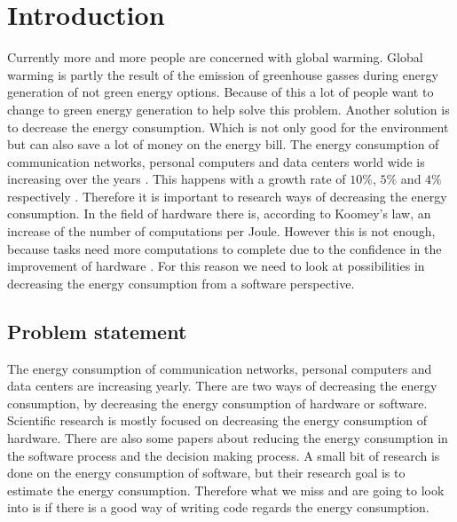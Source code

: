 \chapter{Introduction}
\label{ch:introduction}
Currently more and more people are concerned with global warming. Global warming is partly the result of the emission of greenhouse gasses during energy generation of not green energy options. Because of this a lot of people want to change to green energy generation to help solve this problem. Another solution is to decrease the energy consumption. Which is not only good for the environment but can also save a lot of money on the energy bill. The energy consumption of communication networks, personal computers and data centers world wide is increasing over the years \cite{van2014trends}. This happens with a growth rate of $10\%$, $5\%$ and $4\%$ respectively \cite{van2014trends}. Therefore it is important to research ways of decreasing the energy consumption. In the field of hardware there is, according to Koomey's law, an increase of the number of computations per Joule. However this is not enough, because tasks need more computations to complete due to the confidence in the improvement of hardware \cite{verdecchia2017estimating}. For this reason we need to look at possibilities in decreasing the energy consumption from a software perspective.


\section{Problem statement}
The energy consumption of communication networks, personal computers and data centers are increasing yearly. There are two ways of decreasing the energy consumption, by decreasing the energy consumption of hardware or software. Scientific research is mostly focused on decreasing the energy consumption of hardware. There are also some papers about reducing the energy consumption in the software process and the decision making process. A small bit of research is done on the energy consumption of software, but their research goal is to estimate the energy consumption. Therefore what we miss and are going to look into is if there is a good way of writing code regards the energy consumption.


